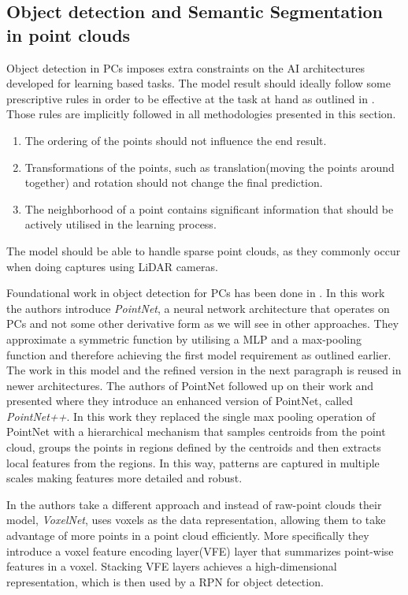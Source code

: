 \subsection{Object detection and Semantic Segmentation in point clouds}
Object detection in \ac{PC}s imposes extra constraints on the AI architectures developed for learning based tasks.
The model result should ideally follow some prescriptive rules in order to be effective at the task at hand as outlined in \cite{qi_pointnet_2017}. Those rules are implicitly followed in all methodologies presented in this section.
\begin{enumerate}
	\item The ordering of the points should not influence the end result.
	\item Transformations of the points, such as translation(moving the points around together) and rotation should not change the final prediction.
	\item The neighborhood of a point contains significant information that should be actively utilised in the learning process.
\end{enumerate}
The model should be able to handle sparse point clouds, as they commonly occur when doing captures using LiDAR cameras.

Foundational work in object detection for \ac{PC}s has been done in \cite{qi_pointnet_2017}.
In this work the authors introduce \emph{PointNet}, a neural network architecture that operates on \ac{PC}s and not some other derivative form as we will see in other approaches. They approximate a symmetric function by utilising a \ac{MLP} and a max-pooling function and therefore achieving the first model requirement as outlined earlier. The work in this model and the refined version in the next paragraph is reused in newer architectures.
The authors of PointNet followed up on their work and presented \cite{qi_pointnet_2017-1} where they introduce an enhanced version of PointNet, called \emph{PointNet++}.
In this work they replaced the single max pooling operation of PointNet with a hierarchical mechanism that samples centroids from the point cloud, groups the points in regions defined by the centroids and then extracts local features from the regions.
In this way, patterns are captured in multiple scales making features more detailed and robust.

\par In \cite{zhou_voxelnet_2018} the authors take a different approach and instead of raw-point clouds their model, \emph{VoxelNet}, uses voxels as the data representation, allowing them to take advantage of more points in a point cloud efficiently. More specifically they introduce a voxel feature encoding layer(VFE) layer that summarizes point-wise features in a voxel. Stacking VFE layers achieves a high-dimensional representation, which is then used by a \ac{RPN} for object detection.

